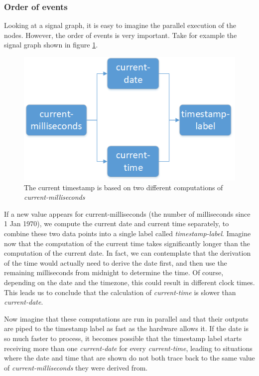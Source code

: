 \subsubsection{Order of events}

Looking at a signal graph, it is easy to imagine the parallel execution of the nodes. However, the order of events is very important. 
Take for example the signal graph shown in figure \ref{fig:relatedwork-elm-eventsorder}.

\begin{figure}[h!]
	\includegraphics[width=\textwidth]{images/RelatedWork-Elm-EventsOrder.png}
	\caption{The current timestamp is based on two different computations of \textit{current-milliseconds}}
	\label{fig:relatedwork-elm-eventsorder}
\end{figure}

If a new value appears for current-milliseconds (the number of milliseconds since 1 Jan 1970), we compute the current date and current time separately, to combine these two data points into a single label called \textit{timestamp-label}. Imagine now that the computation of the current time takes significantly longer than the computation of the current date. In fact, we can contemplate that the derivation of the time would actually need to derive the date first, and then use the remaining milliseconds from midnight to determine the time. Of course, depending on the date and the timezone, this could result in different clock times.
This leads us to conclude that the calculation of \textit{current-time} is slower than \textit{current-date}. 

Now imagine that these computations are run in parallel and that their outputs are piped to the timestamp label as fast as the hardware allows it. If the date is so much faster to process, it becomes possible that the timestamp label starts receiving more than one \textit{current-date} for every \textit{current-time}, leading to situations where the date and time that are shown do not both trace back to the same value of \textit{current-milliseconds} they were derived from. 

